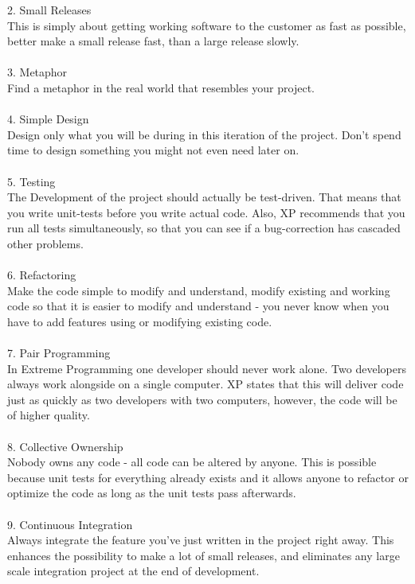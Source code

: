 2. Small Releases\\
This is simply about getting working software to the customer as fast as possible, better make a small release fast, than a large release slowly.\\
\\
3. Metaphor\\
Find a metaphor in the real world that resembles your project.\\
\\
4. Simple Design\\
Design only what you will be during in this iteration of the project. Don't spend time to design something you might not even need later on.\\
\\
5. Testing\\
The Development of the project should actually be test-driven. That means that you write unit-tests before you write actual code. Also, XP recommends that you run all tests simultaneously, so that you can see if a bug-correction has cascaded other problems.\\
\\
6. Refactoring\\
Make the code simple to modify and understand, modify existing and working code so that it is easier to modify and understand - you never know when you have to add features using or modifying existing code.\\
\\
7. Pair Programming\\
In Extreme Programming one developer should never work alone. Two developers always work alongside on a single computer. XP states that this will deliver code just as quickly as two developers with two computers, however, the code will be of higher quality.\\
\\
8. Collective Ownership\\
Nobody owns any code - all code can be altered by anyone. This is possible because unit tests for everything already exists and it allows anyone to refactor or optimize the code as long as the unit tests pass afterwards.\\
\\
9. Continuous Integration\\
Always integrate the feature you've just written in the project right away. This enhances the possibility to make a lot of small releases, and eliminates any large scale integration project at the end of development.\\
